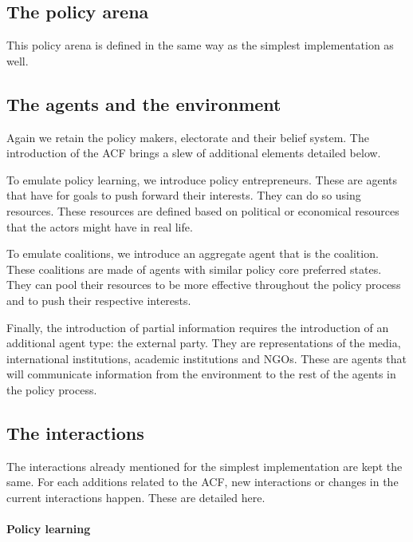 \documentclass[11pt]{article}
\begin{document}
\subsection{The policy arena}

This policy arena is defined in the same way as the simplest implementation as well.


\subsection{The agents and the environment}

Again we retain the policy makers, electorate and their belief system. The introduction of the ACF brings a slew of additional elements detailed below.

To emulate policy learning, we introduce policy entrepreneurs. These are agents that have for goals to push forward their interests. They can do so using resources. These resources are defined based on political or economical resources that the actors might have in real life.

To emulate coalitions, we introduce an aggregate agent that is the coalition. These coalitions are made of agents with similar policy core preferred states. They can pool their resources to be more effective throughout the policy process and to push their respective interests.

Finally, the introduction of partial information requires the introduction of an additional agent type: the external party. They are representations of the media, international institutions, academic institutions and NGOs. These are agents that will communicate information from the environment to the rest of the agents in the policy process.


\subsection{The interactions}

The interactions already mentioned for the simplest implementation are kept the same. For each additions related to the ACF, new interactions or changes in the current interactions happen. These are detailed here.

\paragraph{Policy learning}
\end{document}
